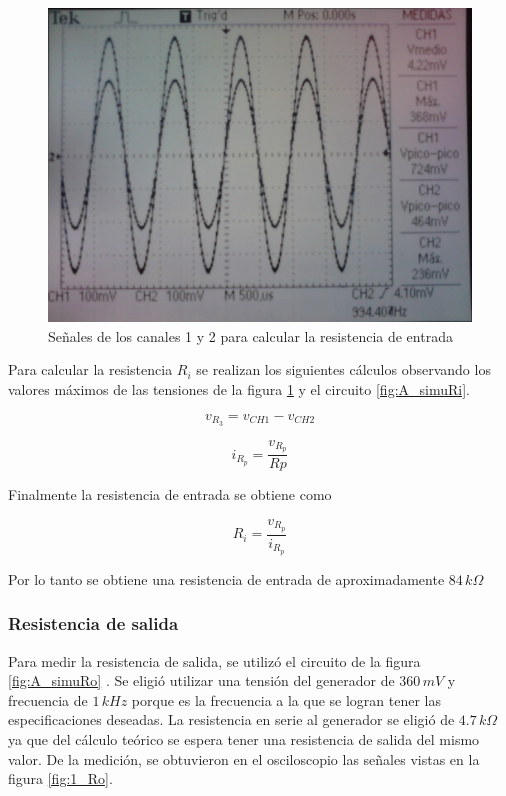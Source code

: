\documentclass[10pt,spanish,a4paper,notitlepage]{article}
\begin{document}
\begin{figure}[H]
\centering
\includegraphics[scale=0.2]{mediciones/1_Ri.jpg}
\caption{Señales de los canales 1 y 2 para calcular la resistencia de entrada}
\label{fig:1_Ri}
\end{figure}

Para calcular la resistencia $R_i$ se realizan los siguientes cálculos observando los valores máximos de las tensiones de la figura \ref{fig:1_Ri} y el circuito \ref{fig:A_simuRi}.

\begin{equation}
    v_{R_3}=v_{CH1}-v_{CH2}
    \label{fig:ec1}
\end{equation}

\begin{equation}
    i_{R_p}=\frac{v_{R_p}}{Rp}
    \label{fig:ec2}
\end{equation}

Finalmente la resistencia de entrada se obtiene como 

\begin{equation}
    R_{i}=\frac{v_{R_p}}{i_{R_p}}
    \label{fig:ec3}
\end{equation}

Por lo tanto se obtiene una resistencia de entrada de aproximadamente $84\,\unit{k\Omega}$

\subsubsection{Resistencia de salida}
Para medir la resistencia de salida, se utilizó el circuito de la figura \ref{fig:A_simuRo} . Se eligió utilizar una tensión del generador de $360\,\unit{mV}$ y frecuencia de $1\,\unit{kHz}$ porque es la frecuencia a la que se logran tener las especificaciones deseadas. La resistencia en serie al generador se eligió de $4.7\,\unit{k\Omega}$ ya que del cálculo teórico se espera tener una resistencia de salida del mismo valor. De la medición, se obtuvieron en el osciloscopio las señales vistas en la figura \ref{fig:1_Ro}.
\end{document}
